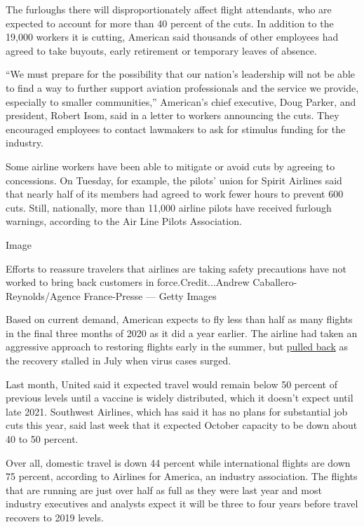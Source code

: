 The furloughs there will disproportionately affect flight attendants,
who are expected to account for more than 40 percent of the cuts. In
addition to the 19,000 workers it is cutting, American said thousands of
other employees had agreed to take buyouts, early retirement or
temporary leaves of absence.

``We must prepare for the possibility that our nation's leadership will
not be able to find a way to further support aviation professionals and
the service we provide, especially to smaller communities,'' American's
chief executive, Doug Parker, and president, Robert Isom, said in a
letter to workers announcing the cuts. They encouraged employees to
contact lawmakers to ask for stimulus funding for the industry.

Some airline workers have been able to mitigate or avoid cuts by
agreeing to concessions. On Tuesday, for example, the pilots' union for
Spirit Airlines said that nearly half of its members had agreed to work
fewer hours to prevent 600 cuts. Still, nationally, more than 11,000
airline pilots have received furlough warnings, according to the Air
Line Pilots Association.

Image

Efforts to reassure travelers that airlines are taking safety
precautions have not worked to bring back customers in
force.Credit...Andrew Caballero-Reynolds/Agence France-Presse --- Getty
Images

Based on current demand, American expects to fly less than half as many
flights in the final three months of 2020 as it did a year earlier. The
airline had taken an aggressive approach to restoring flights early in
the summer, but
\href{https://www.nytimes3xbfgragh.onion/live/2020/08/20/business/stock-market-today-coronavirus/american-airlines-to-stop-flights-to-15-cities-after-government-aid-ends}{pulled
back} as the recovery stalled in July when virus cases surged.

Last month, United said it expected travel would remain below 50 percent
of previous levels until a vaccine is widely distributed, which it
doesn't expect until late 2021. Southwest Airlines, which has said it
has no plans for substantial job cuts this year, said last week that it
expected October capacity to be down about 40 to 50 percent.

Over all, domestic travel is down 44 percent while international flights
are down 75 percent, according to Airlines for America, an industry
association. The flights that are running are just over half as full as
they were last year and most industry executives and analysts expect it
will be three to four years before travel recovers to 2019 levels.

